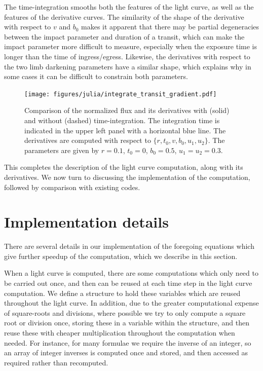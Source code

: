 \documentclass[modern]{aastex61}
\begin{document}
The time-integration smooths both the features of
the light curve, as well as the features of the derivative curves.  The similarity of
the shape of the derivative with respect to $v$ and $b_0$ makes it apparent
that there may be partial degeneracies between the impact parameter and duration
of a transit, which can make the impact parameter more difficult to measure, especially 
when the exposure time is longer than the time of ingress/egress.  Likewise, the
derivatives with respect to the two limb darkening parameters have a similar shape,
which explains why in some cases it can be difficult to constrain both parameters.

\begin{figure}
    \begin{centering}
    \texttt{[image: figures/julia/integrate\_transit\_gradient.pdf]}
    \caption{Comparison of the normalized flux and its derivatives with (solid) and
    without (dashed) time-integration.  The integration time is indicated in the
    upper left panel with a horizontal blue line. The derivatives are computed with
    respect to $\{r,t_0,v,b_0,u_1,u_2\}$.  The parameters are given by $r=0.1$,
    $t_0 = 0$, $b_0=0.5$, $u_1=u_2=0.3$. 
    \label{fig:integrated_derivs}}
    \end{centering}
\end{figure}

This completes the description of the light curve computation, along
with its derivatives.  We now turn to discussing the implementation of
the computation, followed by comparison with existing codes.

\section{Implementation details}

There are several details in our implementation of the foregoing equations
which give further speedup of the computation, which we describe in this
section.

When a light curve is computed, there are some computations which only
need to be carried out once, and then can be reused at each time step in the
light curve computation.  
We define a structure to hold these variables
which are reused throughout the light curve.  In addition, due to the greater 
computational expense of square-roots and divisions, where possible we try 
to only compute a square root or division once, storing these in a variable
within the structure, and then reuse these with cheaper multiplication 
throughout the computation when needed.  For instance, for many formulae we 
require the inverse of an integer, so an array of integer inverses is computed 
once and stored, and then accessed as required rather than recomputed.
\end{document}
